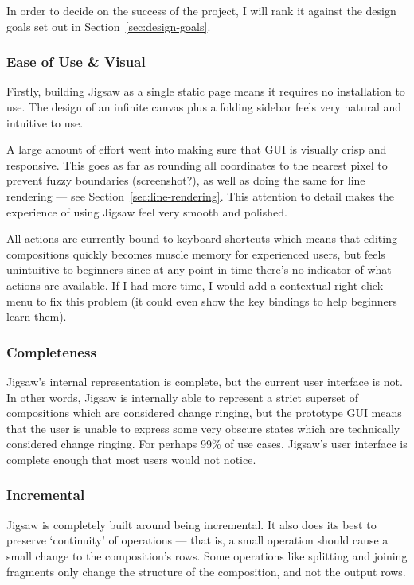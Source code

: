 \documentclass[12pt]{article}
\begin{document}
In order to decide on the success of the project, I will rank it against the design goals set out in
Section~\ref{sec:design-goals}.

\subsubsection{Ease of Use \& Visual}

Firstly, building Jigsaw as a single static page means it requires no installation to use.  The
design of an infinite canvas plus a folding sidebar feels very natural and intuitive to use.

A large amount of effort went into making sure that GUI is visually crisp and responsive.  This
goes as far as rounding all coordinates to the nearest pixel to prevent fuzzy boundaries
(screenshot?), as well as doing the same for line rendering --- see
Section~\ref{sec:line-rendering}.  This attention to detail makes the experience of using Jigsaw
feel very smooth and polished.

All actions are currently bound to keyboard shortcuts which means that editing compositions quickly
becomes muscle memory for experienced users, but feels unintuitive to beginners since at any point
in time there's no indicator of what actions are available.  If I had more time, I would add a
contextual right-click menu to fix this problem (it could even show the key bindings to help
beginners learn them).

\subsubsection{Completeness}

Jigsaw's internal representation is complete, but the current user interface is not.  In other
words, Jigsaw is internally able to represent a strict superset of compositions which are considered
change ringing, but the prototype GUI means that the user is unable to express some very obscure
states which are technically considered change ringing.  For perhaps 99\% of use cases, Jigsaw's
user interface is complete enough that most users would not notice.

\subsubsection{Incremental}

Jigsaw is completely built around being incremental.  It also does its best to preserve `continuity'
of operations --- that is, a small operation should cause a small change to the composition's rows.
Some operations like splitting and joining fragments only change the structure of the composition,
and not the output rows.
\end{document}
